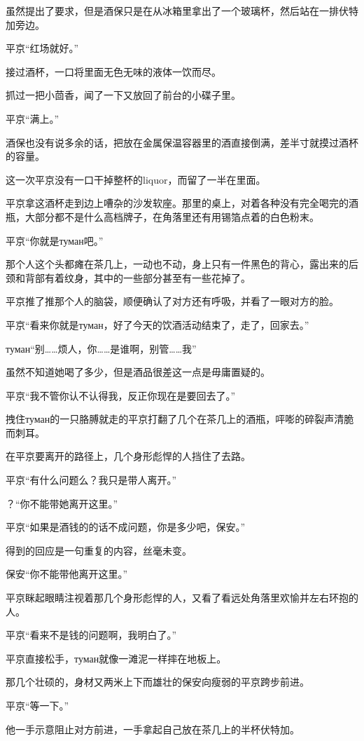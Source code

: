 \documentclass{article}
\begin{document}
虽然提出了要求，但是酒保只是在从冰箱里拿出了一个玻璃杯，然后站在一排伏特加旁边。

平京“红场就好。”

接过酒杯，一口将里面无色无味的液体一饮而尽。

抓过一把小茴香，闻了一下又放回了前台的小碟子里。

平京“满上。”

酒保也没有说多余的话，把放在金属保温容器里的酒直接倒满，差半寸就摸过酒杯的容量。

这一次平京没有一口干掉整杯的liquor，而留了一半在里面。

平京拿这酒杯走到边上嘈杂的沙发软座。那里的桌上，对着各种没有完全喝完的酒瓶，大部分都不是什么高档牌子，在角落里还有用锡箔点着的白色粉末。

平京“你就是туман吧。”

那个人这个头都瘫在茶几上，一动也不动，身上只有一件黑色的背心，露出来的后颈和背部有着纹身，其中的一些部分甚至有一些花掉了。

平京推了推那个人的脑袋，顺便确认了对方还有呼吸，并看了一眼对方的脸。

平京“看来你就是туман，好了今天的饮酒活动结束了，走了，回家去。”

туман“别……烦人，你……是谁啊，别管……我”

虽然不知道她喝了多少，但是酒品很差这一点是毋庸置疑的。

平京“我不管你认不认得我，反正你现在是要回去了。”

拽住туман的一只胳膊就走的平京打翻了几个在茶几上的酒瓶，呯嘭的碎裂声清脆而刺耳。

在平京要离开的路径上，几个身形彪悍的人挡住了去路。

平京“有什么问题么？我只是带人离开。”

？“你不能带她离开这里。”

平京“如果是酒钱的的话不成问题，你是多少吧，保安。”

得到的回应是一句重复的内容，丝毫未变。

保安“你不能带他离开这里。”

平京眯起眼睛注视着那几个身形彪悍的人，又看了看远处角落里欢愉并左右环抱的人。

平京“看来不是钱的问题啊，我明白了。”

平京直接松手，туман就像一滩泥一样摔在地板上。

那几个壮硕的，身材又两米上下而雄壮的保安向瘦弱的平京跨步前进。

平京“等一下。”

他一手示意阻止对方前进，一手拿起自己放在茶几上的半杯伏特加。
\end{document}
